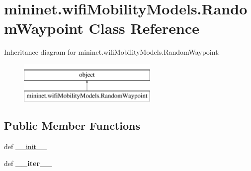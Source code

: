 \hypertarget{classmininet_1_1wifiMobilityModels_1_1RandomWaypoint}{\section{mininet.\-wifi\-Mobility\-Models.\-Random\-Waypoint Class Reference}
\label{classmininet_1_1wifiMobilityModels_1_1RandomWaypoint}
}
Inheritance diagram for mininet.\-wifi\-Mobility\-Models.\-Random\-Waypoint\-:\begin{figure}[H]
\begin{center}
\leavevmode
\includegraphics[height=2.000000cm]{classmininet_1_1wifiMobilityModels_1_1RandomWaypoint}
\end{center}
\end{figure}
\subsection*{Public Member Functions}
\begin{DoxyCompactItemize}
\item 
def \hyperlink{classmininet_1_1wifiMobilityModels_1_1RandomWaypoint_ac1ac4b60d2dbca916ebd2f1793cf05d9}{\-\_\-\-\_\-init\-\_\-\-\_\-}
\item 
\hypertarget{classmininet_1_1wifiMobilityModels_1_1RandomWaypoint_a01f5d4017bc5d4c557ecc5e1bda071e6}{def {\bfseries \-\_\-\-\_\-iter\-\_\-\-\_\-}}\label{classmininet_1_1wifiMobilityModels_1_1RandomWaypoint_a01f5d4017bc5d4c557ecc5e1bda071e6}

\end{DoxyCompactItemize}
